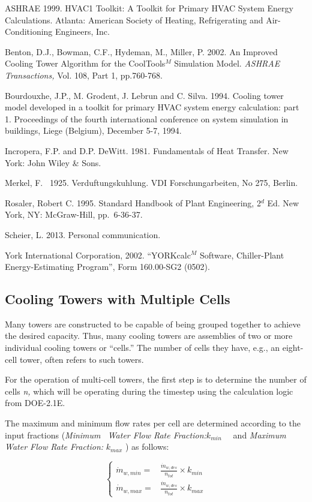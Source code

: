 ASHRAE 1999. HVAC1 Toolkit: A Toolkit for Primary HVAC System Energy Calculations. Atlanta: American Society of Heating, Refrigerating and Air-Conditioning Engineers, Inc.

Benton, D.J., Bowman, C.F., Hydeman, M., Miller, P. 2002. An Improved Cooling Tower Algorithm for the CoolTools\(^{M}\) Simulation Model. \emph{ASHRAE Transactions,} Vol. 108, Part 1, pp.760-768.

Bourdouxhe, J.P., M. Grodent, J. Lebrun and C. Silva. 1994. Cooling tower model developed in a toolkit for primary HVAC system energy calculation: part 1. Proceedings of the fourth international conference on system simulation in buildings, Liege (Belgium), December 5-7, 1994.

Incropera, F.P. and D.P. DeWitt. 1981. Fundamentals of Heat Transfer. New York: John Wiley \& Sons.

Merkel, F.~ 1925. Verduftungskuhlung. VDI Forschungarbeiten, No 275, Berlin.

Rosaler, Robert C. 1995. Standard Handbook of Plant Engineering, 2\(^{d}\) Ed. New York, NY: McGraw-Hill, pp.~6-36-37.

Scheier, L. 2013. Personal communication.

York International Corporation, 2002. ``YORKcalc\(^{M}\) Software, Chiller-Plant Energy-Estimating Program'', Form 160.00-SG2 (0502).

\subsection{Cooling Towers with Multiple Cells}\label{cooling-towers-with-multiple-cells}

Many towers are constructed to be capable of being grouped together to achieve the desired capacity. Thus, many cooling towers are assemblies of two or more individual cooling towers or ``cells.'' The number of cells they have, e.g., an eight-cell tower, often refers to such towers.

For the operation of multi-cell towers, the first step is to determine the number of cells \emph{n,} which will be operating during the timestep using the calculation logic from DOE-2.1E.

The maximum and minimum flow rates per cell are determined according to the input fractions (\emph{Minimum~ Water Flow Rate Fraction:}\({k_{min}}\) \emph{~}~and \emph{Maximum~ Water Flow Rate Fraction:} \({k_{max}}\) ) as follows:

\begin{equation}
\left\{
    \begin{array}{rl}
      {{\dot m}_{w,min}} =  & \frac{{{{\dot m}_{w,des}}}}{{{n_{tot}}}} \times {k_{min}} \\
      {{\dot m}_{w,max}} =  & \frac{{{{\dot m}_{w,des}}}}{{{n_{tot}}}} \times {k_{max}}
    \end{array}
  \right.
\end{equation}

